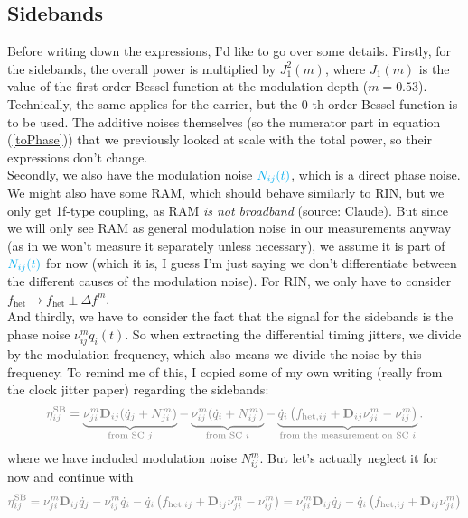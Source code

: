 \documentclass[11pt]{article}
\begin{document}
\subsection{Sidebands}
Before writing down the expressions, I'd like to go over some details. Firstly, for the sidebands, the overall power is multiplied by $J_1^2(m)$, where $J_1(m)$ is the value of the first-order Bessel function at the modulation depth ($m=0.53$). Technically, the same applies for the carrier, but the 0-th order Bessel function is to be used. The additive noises themselves (so the numerator part in equation (\ref{toPhase})) that we previously looked at scale with the total power, so their expressions don't change.\\
\newline
Secondly, we also have the modulation noise ${\color{cyan}N_{ij}(t)}$, which is a direct phase noise. We might also have some RAM, which should behave similarly to RIN, but we only get 1f-type coupling, as RAM \textit{is not broadband} (source: Claude). But since we will only see RAM as general modulation noise in our measurements anyway (as in we won't measure it separately unless necessary), we assume it is part of ${\color{cyan}N_{ij}(t)}$ for now (which it is, I guess I'm just saying we don't differentiate between the different causes of the modulation noise). For RIN, we only have to consider $f_{\text{het}}\rightarrow f_{\text{het}} \pm \Delta f^m$.\\
\newline
And thirdly, we have to consider the fact that the signal for the sidebands is the phase noise $\nu_{ij}^mq_i(t)$. So when extracting the differential timing jitters, we divide by the modulation frequency, which also means we divide the noise by this frequency. To remind me of this, I copied some of my own writing (really from the clock jitter paper) regarding the sidebands:
\begin{equation*}
\color{gray}
\eta^{\text{SB}}_{ij} =
\underbrace{%
    \nu_{j i}^{m} \mathbf{D}_{ij} (\dot{q}_j + N_{j i}^{m})
}_{\text{from SC $j$}}
-
\underbrace{%
    \nu_{i j}^{m} (\dot{q}_i + N_{i j}^{m})
}_{\text{from SC $i$}}
-
\underbrace{%
    \dot{q}_i \left( f_{\text{het,}ij} + \mathbf{D}_{ij} \nu_{j i}^{m} - \nu_{i j}^{m} \right)
}_{\text{from the measurement on SC $i$}}.
\end{equation*}
where we have included modulation noise $N_{ij}^m$. But let's actually neglect it for now and continue with
\begin{equation*}
\color{gray}
    \eta^{\text{SB}}_{ij}=\nu_{j i}^{m} \mathbf{D}_{ij} \dot{q}_j
-\nu_{i j}^{m} \dot{q}_i -\dot{q}_i \left( f_{\text{het,}ij} + \mathbf{D}_{ij} \nu_{j i}^{m} - \nu_{i j}^{m} \right) = \nu_{j i}^{m} \mathbf{D}_{ij} \dot{q}_j -\dot{q}_i \left( f_{\text{het,}ij} + \mathbf{D}_{ij} \nu_{j i}^{m} \right)
\end{equation*}
\end{document}
